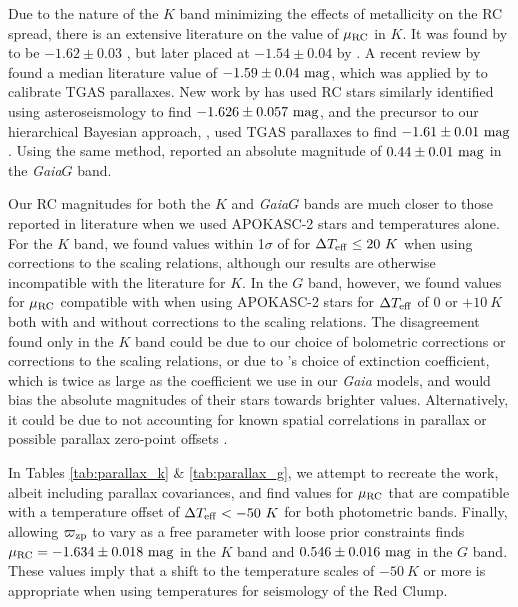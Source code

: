\documentclass[fleqn,usenatbib]{mnras}
\newcommand{\oozp}{\mbox{$\varpi_{\rm zp}$}\xspace}
\newcommand{\murc}{\mbox{$\mu_{\rm RC}$}\xspace}
\newcommand{\teff}{\mbox{$T_{\rm eff}$}\xspace}
\newcommand{\gaia}{\emph{Gaia}\xspace}
\newcommand{\new}[1]{#1}
\newcommand{\up}[1]{#1}
\begin{document}
Due to the nature of the $K$ band minimizing the effects of metallicity on the RC spread, there is an extensive literature on the value of \murc in $K$. \new{It was found} by \cite{art:alves2000} to be $-1.62 \pm 0.03$ \citep[with a consistent measurement by][]{art:udalski2000}, but later placed at $-1.54 \pm 0.04$ by \cite{art:groenewegen2008}. A recent review by \cite{art:girardi2016} found a median literature value of $-1.59 \pm 0.04\ \rm mag$, which was applied by \cite{art:davies+2017} to calibrate TGAS parallaxes. New work by \cite{art:chen+2017} has used RC stars similarly identified using asteroseismology to find $-1.626 \pm 0.057\ \rm mag$, and the precursor to our hierarchical Bayesian approach, , used TGAS parallaxes to find $-1.61 \pm 0.01\ \rm mag$. Using the same method,  reported an absolute magnitude of $0.44 \pm 0.01\ \rm mag$ in the \gaia $G$ band.

Our RC magnitudes for both the $K$ and \gaia $G$ bands are much closer to those reported in literature when we used APOKASC-2 stars and temperatures alone. For the $K$ band, we found values within 1$\sigma$ of \cite{art:chen+2017} for $\Delta\teff \leq 20\ K$ when using corrections to the scaling relations, although our results are otherwise incompatible with the literature for $K$. In the $G$ band, however, we found values for \murc compatible with  when using APOKASC-2 stars for $\Delta\teff$ of $0$ or $+10\ K$ both with and without corrections to the scaling relations. \up{The disagreement found only in the $K$ band} could be due to our choice of bolometric corrections or corrections to the scaling relations, or due to 's choice of extinction coefficient, which is twice as large as the coefficient we use in our \gaia models, and would bias the absolute magnitudes of their stars towards brighter values. Alternatively, it could be due to  not accounting for known spatial correlations in parallax \citep{art:lindegren+2016, art:zinn+2017} or possible parallax zero-point offsets \citep{art:brown2018}.

In Tables \ref{tab:parallax_k} \& \ref{tab:parallax_g}, we attempt to recreate the  work, albeit including parallax covariances, and find values for \murc that are compatible with a temperature offset of $\Delta\teff < -50\ K$ for both photometric bands. \up{Finally, allowing \oozp to vary as a free parameter with loose prior constraints finds $\murc = -1.634 \pm 0.018\ \rm mag$ in the $K$ band and $0.546 \pm 0.016\ \rm mag$ in the $G$ band. These values imply that a shift to the temperature scales of $-50\ K$ or more is appropriate when using temperatures for seismology of the Red Clump. }
\end{document}
